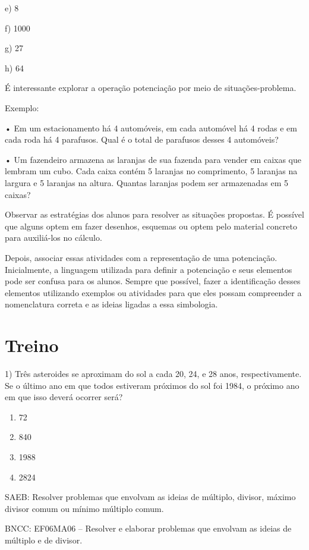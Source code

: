 e) 8

f) 1000

g) 27

h) 64

É interessante explorar a operação potenciação por meio de
situações-problema.

Exemplo:

• Em um estacionamento há 4 automóveis, em cada automóvel há 4 rodas e
em cada roda há 4 parafusos. Qual é o total de parafusos desses 4
automóveis?

• Um fazendeiro armazena as laranjas de sua fazenda para vender em
caixas que lembram um cubo. Cada caixa contém 5 laranjas no comprimento,
5 laranjas na largura e 5 laranjas na altura. Quantas laranjas podem ser
armazenadas em 5 caixas?

Observar as estratégias dos alunos para resolver as situações propostas.
É possível que alguns optem em fazer desenhos, esquemas ou optem pelo
material concreto para auxiliá-los no cálculo.

Depois, associar essas atividades com a representação de uma
potenciação. Inicialmente, a linguagem utilizada para definir a
potenciação e seus elementos pode ser confusa para os alunos. Sempre que
possível, fazer a identificação desses elementos utilizando exemplos ou
atividades para que eles possam compreender a nomenclatura correta e as
ideias ligadas a essa simbologia.

\section{Treino}

1) Três asteroides se aproximam do sol a cada 20, 24, e 28 anos,
respectivamente. Se o último ano em que todos estiveram próximos do sol
foi 1984, o próximo ano em que isso deverá ocorrer será?

\begin{enumerate}
\def\labelenumi{\alph{enumi})}
\item
  72
\item
  840
\item
  1988
\item
  2824
\end{enumerate}

SAEB: Resolver problemas que envolvam as ideias de múltiplo, divisor,
máximo divisor comum ou mínimo múltiplo comum.

BNCC: EF06MA06 -- Resolver e elaborar problemas que envolvam as ideias
de múltiplo e de divisor.

